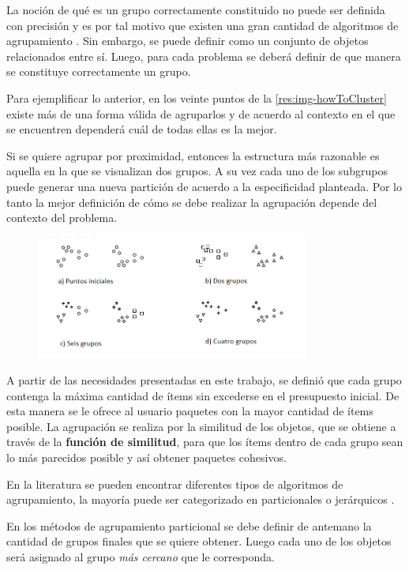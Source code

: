 La noción de qué es un grupo correctamente constituido no puede ser definida con precisión y es por tal motivo que existen una gran cantidad de algoritmos de agrupamiento \cite{Estivill-Castro:2002:WSM:568574.568575}. Sin embargo, se puede definir como un conjunto de objetos relacionados entre sí. Luego, para cada problema se deberá definir de que manera se constituye correctamente un grupo.

Para ejemplificar lo anterior, en los veinte puntos de la \autoref{res:img-howToCluster} existe más de una forma válida de agruparlos y de acuerdo al contexto en el que se encuentren dependerá cuál de todas ellas es la mejor.

Si se quiere agrupar por proximidad, entonces la estructura más razonable es aquella en la que se visualizan dos grupos. A su vez cada uno de los subgrupos puede generar una nueva partición de acuerdo a la especificidad planteada. Por lo tanto la mejor definición de cómo se debe realizar la agrupación depende del contexto del problema.

\begin{figure}[H]
  \centering
   \includegraphics[width=0.8\textwidth]{img/howToCluster.png}
   \caption{}
   \label{res:img-howToCluster}
\end{figure}

A partir de las necesidades presentadas en este trabajo, se definió que cada grupo contenga la máxima cantidad de ítems sin excederse en el presupuesto inicial. De esta manera se le ofrece al usuario paquetes con la mayor cantidad de ítems posible. La agrupación se realiza por la similitud de los objetos, que se obtiene a través de la \textbf{función de similitud}, para que los ítems dentro de cada grupo sean lo más parecidos posible y así obtener paquetes cohesivos.

En la literatura se pueden encontrar diferentes tipos de algoritmos de agrupamiento, la mayoría puede ser categorizado en particionales o jerárquicos \cite{opac-b1087461}. 

En los métodos de agrupamiento particional se debe definir de antemano la cantidad de grupos finales que se quiere obtener. Luego cada uno de los objetos será asignado al grupo \textit{más cercano} que le corresponda.

